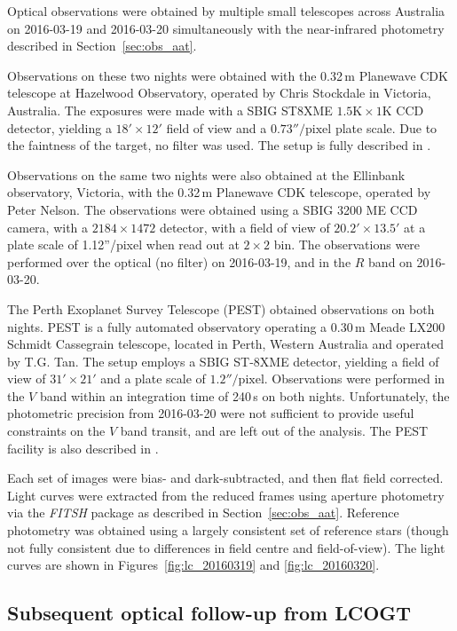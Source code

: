 \documentclass[apj]{emulateapj}
\begin{document}
Optical observations were obtained by multiple small telescopes across Australia on 2016-03-19 and 2016-03-20 simultaneously with the near-infrared photometry described in Section~\ref{sec:obs_aat}. 

Observations on these two nights were obtained with the 0.32\,m Planewave CDK telescope at Hazelwood Observatory, operated by Chris Stockdale in Victoria, Australia. The exposures were made with a SBIG ST8XME $1.5\mathrm{K}\times1 \mathrm{K}$ CCD detector, yielding a $18'\times12'$ field of view and a $0.73''/\mathrm{pixel}$ plate scale. Due to the faintness of the target, no filter was used. The setup is fully described in \citet{2015arXiv150908953R}.

Observations on the same two nights were also obtained at the Ellinbank observatory, Victoria, with the 0.32\,m Planewave CDK telescope, operated by Peter Nelson. The observations were obtained using a SBIG 3200 ME CCD camera, with a $2184\times1472$ detector, with a field of view of $20.2' \times 13.5'$ at a plate scale of 1.12''/pixel when read out at $2\times 2$ bin. The observations were performed over the optical (no filter) on 2016-03-19, and in the $R$ band on 2016-03-20. 

The Perth Exoplanet Survey Telescope (PEST) obtained observations on both nights. PEST is a fully automated observatory operating a 0.30\,m Meade LX200 Schmidt Cassegrain telescope, located in Perth, Western Australia and operated by T.G. Tan. The setup employs a SBIG ST-8XME detector, yielding a field of view of $31'\times 21'$ and a plate scale of $1.2''/\mathrm{pixel}$. Observations were performed in the $V$ band within an integration time of 240\,s on both nights. Unfortunately, the photometric precision from 2016-03-20 were not sufficient to provide useful constraints on the $V$ band transit, and are left out of the analysis. The PEST facility is also described in \citet{2015arXiv150908953R}.

Each set of images were bias- and dark-subtracted, and then flat field corrected. Light curves were extracted from the reduced frames using aperture photometry via the \emph{FITSH} package as described in Section~\ref{sec:obs_aat}. Reference photometry was obtained using a largely consistent set of reference stars (though not fully consistent due to differences in field centre and field-of-view). The light curves are shown in Figures~\ref{fig:lc_20160319} and \ref{fig:lc_20160320}. 


\subsection{Subsequent optical follow-up from LCOGT}
\label{sec:lcogt}
\end{document}
